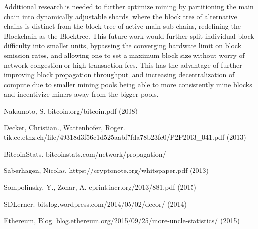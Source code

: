 \documentclass{article}
\begin{document}
Additional research is needed to further optimize mining by partitioning the main chain into dynamically adjustable shards, where the block tree of alternative chains is distinct from the block tree of active main sub-chains, redefining the Blockchain as the Blocktree. This future work would further split individual block difficulty into smaller units, bypassing the converging hardware limit on block emission rates, and allowing one to set a maximum block size without worry of network congestion or high transaction fees. This has the advantage of further improving block propagation throughput, and increasing decentralization of compute due to smaller mining pools being able to more consistently mine blocks and incentivize miners away from the bigger pools.

\begin{thebibliography}{999}

  Nakamoto, S.
  \newblock bitcoin.org/bitcoin.pdf (2008)

  Decker, Christian., Wattenhofer, Roger.
  \newblock tik.ee.ethz.ch/file/49318d3f56c1d525aabf7fda78b23fc0/P2P2013\_041.pdf (2013)

  BitcoinStats.
  \newblock bitcoinstats.com/network/propagation/

  Saberhagen, Nicolas.
  \newblock https://cryptonote.org/whitepaper.pdf (2013)

  Sompolinsky, Y., Zohar, A.
  \newblock eprint.iacr.org/2013/881.pdf (2015)

  SDLerner.
  \newblock bitslog.wordpress.com/2014/05/02/decor/ (2014)

  Ethereum, Blog.
  \newblock blog.ethereum.org/2015/09/25/more-uncle-statistics/ (2015)

\end{thebibliography}
\end{document}
